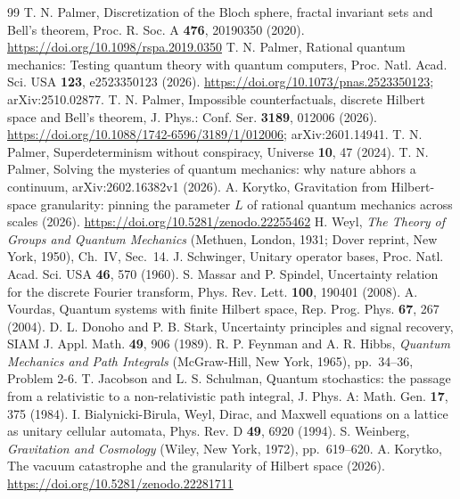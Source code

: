 \documentclass[aps,prd,twocolumn,superscriptaddress,nofootinbib]{revtex4-2}
\begin{document}
\begin{thebibliography}{99}
 T. N. Palmer, Discretization of the Bloch sphere, fractal invariant sets and Bell's theorem, Proc. R. Soc. A \textbf{476}, 20190350 (2020). \url{https://doi.org/10.1098/rspa.2019.0350}
 T. N. Palmer, Rational quantum mechanics: Testing quantum theory with quantum computers, Proc. Natl. Acad. Sci. USA \textbf{123}, e2523350123 (2026). \url{https://doi.org/10.1073/pnas.2523350123}; arXiv:2510.02877.
 T. N. Palmer, Impossible counterfactuals, discrete Hilbert space and Bell's theorem, J. Phys.: Conf. Ser. \textbf{3189}, 012006 (2026). \url{https://doi.org/10.1088/1742-6596/3189/1/012006}; arXiv:2601.14941.
 T. N. Palmer, Superdeterminism without conspiracy, Universe \textbf{10}, 47 (2024).
 T. N. Palmer, Solving the mysteries of quantum mechanics: why nature abhors a continuum, arXiv:2602.16382v1 (2026).
 A. Korytko, Gravitation from Hilbert-space granularity: pinning the parameter $L$ of rational quantum mechanics across scales (2026). \url{https://doi.org/10.5281/zenodo.22255462}
 H. Weyl, \emph{The Theory of Groups and Quantum Mechanics} (Methuen, London, 1931; Dover reprint, New York, 1950), Ch.~IV, Sec.~14.
 J. Schwinger, Unitary operator bases, Proc. Natl. Acad. Sci. USA \textbf{46}, 570 (1960).
 S. Massar and P. Spindel, Uncertainty relation for the discrete Fourier transform, Phys. Rev. Lett. \textbf{100}, 190401 (2008).
 A. Vourdas, Quantum systems with finite Hilbert space, Rep. Prog. Phys. \textbf{67}, 267 (2004).
 D. L. Donoho and P. B. Stark, Uncertainty principles and signal recovery, SIAM J. Appl. Math. \textbf{49}, 906 (1989).
 R. P. Feynman and A. R. Hibbs, \emph{Quantum Mechanics and Path Integrals} (McGraw-Hill, New York, 1965), pp.~34--36, Problem 2-6.
 T. Jacobson and L. S. Schulman, Quantum stochastics: the passage from a relativistic to a non-relativistic path integral, J. Phys. A: Math. Gen. \textbf{17}, 375 (1984).
 I. Bialynicki-Birula, Weyl, Dirac, and Maxwell equations on a lattice as unitary cellular automata, Phys. Rev. D \textbf{49}, 6920 (1994).
 S. Weinberg, \emph{Gravitation and Cosmology} (Wiley, New York, 1972), pp.~619--620.
 A. Korytko, The vacuum catastrophe and the granularity of Hilbert space (2026). \url{https://doi.org/10.5281/zenodo.22281711}

\end{thebibliography}
\end{document}
